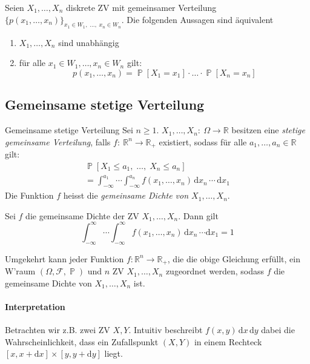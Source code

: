 \documentclass[a4paper,10pt]{article}
\def\R{\mathbb{R}}
\def\F{\mathcal{F}}
\renewcommand{\P}{\operatorname{\mathbb{P}}}
\numberwithin{equation}{section}
\begin{document}
\begin{mainbox}{}
    Seien \( X_1, \dots, X_n \) diskrete ZV mit gemeinsamer Verteilung \( \{p(x_1, \dots, x_n)\}_{x_1 \in W_1, \; \dots, \; x_n \in W_n} \). Die folgenden Aussagen sind äquivalent
    \begin{enumerate}
        \item \( X_1, \dots, X_n \) sind unabhängig
        \item für alle \( x_1 \in W_1, \dots, x_n \in W_n \) gilt:
        \[
            p(x_1, \dots, x_n) = \P[X_1 = x_1] \cdot \dots \cdot \P[X_n = x_n]
        \]
    \end{enumerate}
\end{mainbox}

\subsection{Gemeinsame stetige Verteilung}

\begin{mainbox}{Gemeinsame stetige Verteilung}
    Sei \( n \geq 1 \). \( X_1, \dots, X_n: \: \Omega \to \R \) besitzen eine \emph{stetige gemeinsame Verteilung}, falls \( f: \: \R^n \to \R_+ \) existiert, sodass für alle \( a_1, \dots, a_n \in \R \) gilt:
    \begin{multline*}
        \P[X_1 \leq a_1, \; \dots, \; X_n \leq a_n] \\
        = \int_{-\infty}^{a_1} \dotsi \int_{-\infty}^{a_n} f(x_1, \dots, x_n) \, \mathrm{d}x_n \, \dotsi \, \mathrm{d}x_1
    \end{multline*}
    Die Funktion \( f \) heisst die \emph{gemeinsame Dichte von \( X_1, \dots, X_n \)}.
\end{mainbox}

\begin{mainbox}{}
    Sei \( f \) die gemeinsame Dichte der ZV \( X_1, \dots, X_n \). Dann gilt
    \[
        \int_{-\infty}^\infty \dotsi \int_{-\infty}^\infty f(x_1, \dots, x_n) \, \mathrm{d}x_n \, \dotsi \mathrm{d}x_1 = 1
    \]
\end{mainbox}
Umgekehrt kann jeder Funktion \( f: \R^n \to \R_+ \), die die obige Gleichung erfüllt, ein W'raum \( (\Omega, \F, \P) \) und \( n \) ZV \( X_1, \dots, X_n \) zugeordnet werden, sodass \(  f \) die gemeinsame Dichte von \( X_1, \dots, X_n \) ist.

\paragraph{Interpretation} Betrachten wir z.B. zwei ZV \( X, Y \). Intuitiv beschreibt \( f(x, y) \, \mathrm{d}x \, \mathrm{d}y \) dabei die Wahrscheinlichkeit, dass ein Zufallspunkt \( (X, Y) \) in einem Rechteck \( [x, x + \mathrm{d}x] \times [y, y + \mathrm{d}y] \) liegt.
\end{document}
